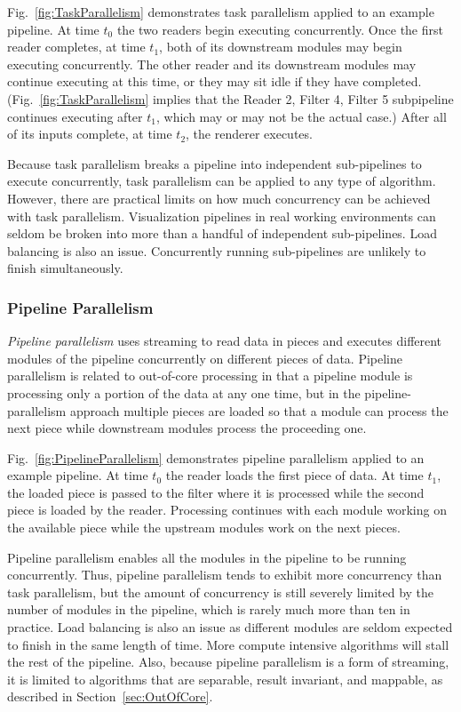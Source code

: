 \documentclass[journal,twocolumn,10pt,letterpaper,twoside]{IEEEtran}
\newcommand*{\figref}[1]{Fig.~\ref{#1}}
\newcommand*{\keyterm}[1]{\emph{#1}}
\begin{document}
\figref{fig:TaskParallelism} demonstrates task parallelism applied to
an example pipeline.  At time $t_0$ the two readers begin executing
concurrently.  Once the first reader completes, at time $t_1$, both of its
downstream modules may begin executing concurrently.  The other reader
and its downstream modules may continue executing at this time, or they
may sit idle if they have completed. (\figref{fig:TaskParallelism} implies
that the Reader 2, Filter 4, Filter 5 subpipeline continues executing after
$t_1$, which may or may not be the actual case.) After all of its inputs
complete, at time $t_2$, the renderer executes.

Because task parallelism breaks a pipeline into independent sub-pipelines
to execute concurrently, task parallelism can be applied to any type of
algorithm.  However, there are practical limits on how much concurrency
can be achieved with task parallelism.  Visualization pipelines in real
working environments can seldom be broken into more than a handful of
independent sub-pipelines.  Load balancing is also an issue.  Concurrently
running sub-pipelines are unlikely to finish simultaneously.

\subsubsection{Pipeline Parallelism}
\label{sec:PipelineParallelism}

\keyterm{Pipeline parallelism} uses streaming to read data in pieces and
executes different modules of the pipeline concurrently on different
pieces of data.  Pipeline parallelism is related to out-of-core processing
in that a pipeline module is processing only a portion of the data at
any one time, but in the pipeline-parallelism approach multiple pieces are
loaded so that a module can process the next piece while downstream
modules process the proceeding one.

\figref{fig:PipelineParallelism} demonstrates pipeline parallelism
applied to an example pipeline.  At time $t_0$ the reader loads the first
piece of data.  At time $t_1$, the loaded piece is passed to the filter
where it is processed while the second piece is loaded by the reader.
Processing continues with each module working on the available piece
while the upstream modules work on the next pieces.

Pipeline parallelism enables all the modules in the pipeline to be
running concurrently.  Thus, pipeline parallelism tends to exhibit more
concurrency than task parallelism, but the amount of concurrency is still
severely limited by the number of modules in the pipeline, which is
rarely much more than ten in practice.  Load balancing is also an issue as
different modules are seldom expected to finish in the same length of
time.  More compute intensive algorithms will stall the rest of the
pipeline.  Also, because pipeline parallelism is a form of streaming, it is
limited to algorithms that are separable, result invariant, and mappable,
as described in Section~\ref{sec:OutOfCore}.
\end{document}
